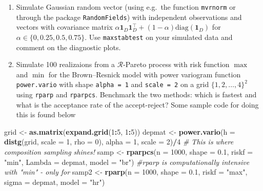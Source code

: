 \documentclass[]{book}
\newenvironment{Shaded}{\begin{snugshade}}{\end{snugshade}}
\newcommand{\CommentTok}[1]{\textcolor[rgb]{0.56,0.35,0.01}{\textit{#1}}}
\newcommand{\DataTypeTok}[1]{\textcolor[rgb]{0.13,0.29,0.53}{#1}}
\newcommand{\DecValTok}[1]{\textcolor[rgb]{0.00,0.00,0.81}{#1}}
\newcommand{\FloatTok}[1]{\textcolor[rgb]{0.00,0.00,0.81}{#1}}
\newcommand{\KeywordTok}[1]{\textcolor[rgb]{0.13,0.29,0.53}{\textbf{#1}}}
\newcommand{\NormalTok}[1]{#1}
\newcommand{\OperatorTok}[1]{\textcolor[rgb]{0.81,0.36,0.00}{\textbf{#1}}}
\newcommand{\StringTok}[1]{\textcolor[rgb]{0.31,0.60,0.02}{#1}}
\providecommand{\tightlist}{%
  \setlength{\itemsep}{0pt}\setlength{\parskip}{0pt}}
\begin{document}
\begin{enumerate}
\def\labelenumi{\arabic{enumi}.}
\tightlist
\item
  Simulate Gaussian random vector (using e.g.~the function \texttt{mvrnorm} or through the package \texttt{RandomFields}) with independent observations and vectors with covariance matrix \(\alpha \boldsymbol{1}_D\boldsymbol{1}_D^\top + (1-\alpha)\mathrm{diag}(\boldsymbol{1}_D)\) for \(\alpha \in \{0,0.25,0.5,0.75\}\). Use \texttt{maxstabtest} on your simulated data and comment on the diagnostic plots.
\item
  Simulate 100 realizaions from a \(\mathcal{R}\)-Pareto process with risk function \(\max\) and \(\min\) for the Brown--Resnick model with power variogram function \texttt{power.vario} with shape \texttt{alpha\ =\ 1} and \texttt{scale\ =\ 2} on a grid \(\{1,2,\ldots, 4\}^2\) using \texttt{rparp} and \texttt{rparpcs}. Benchmark the two methods: which is fastest and what is the acceptance rate of the accept-reject?
  Some sample code for doing this is found below
\end{enumerate}

\begin{Shaded}
\begin{Highlighting}[]
\NormalTok{grid <-}\StringTok{ }\KeywordTok{as.matrix}\NormalTok{(}\KeywordTok{expand.grid}\NormalTok{(}\DecValTok{1}\OperatorTok{:}\DecValTok{5}\NormalTok{, }\DecValTok{1}\OperatorTok{:}\DecValTok{5}\NormalTok{))}
\NormalTok{depmat <-}\StringTok{ }\KeywordTok{power.vario}\NormalTok{(}\DataTypeTok{h =} \KeywordTok{distg}\NormalTok{(grid, }\DataTypeTok{scale =} \DecValTok{1}\NormalTok{, }\DataTypeTok{rho =} \DecValTok{0}\NormalTok{), }\DataTypeTok{alpha =} \DecValTok{1}\NormalTok{, }\DataTypeTok{scale =} \DecValTok{2}\NormalTok{)}\OperatorTok{/}\DecValTok{4}
\CommentTok{# This is where composition sampling shines!}
\NormalTok{samp <-}\StringTok{ }\KeywordTok{rparpcs}\NormalTok{(}\DataTypeTok{n =} \DecValTok{1000}\NormalTok{, }\DataTypeTok{shape =} \FloatTok{0.1}\NormalTok{, }\DataTypeTok{riskf =} \StringTok{"min"}\NormalTok{,}
      \DataTypeTok{Lambda =}\NormalTok{ depmat, }\DataTypeTok{model =} \StringTok{"br"}\NormalTok{)}
\CommentTok{#rparp is computationally intensive with "min" - only for }
\NormalTok{samp2 <-}\StringTok{ }\KeywordTok{rparp}\NormalTok{(}\DataTypeTok{n =} \DecValTok{1000}\NormalTok{, }\DataTypeTok{shape =} \FloatTok{0.1}\NormalTok{, }\DataTypeTok{riskf =} \StringTok{"max"}\NormalTok{,  }
      \DataTypeTok{sigma =}\NormalTok{ depmat, }\DataTypeTok{model =} \StringTok{"hr"}\NormalTok{)}
\end{Highlighting}
\end{Shaded}


\end{document}
